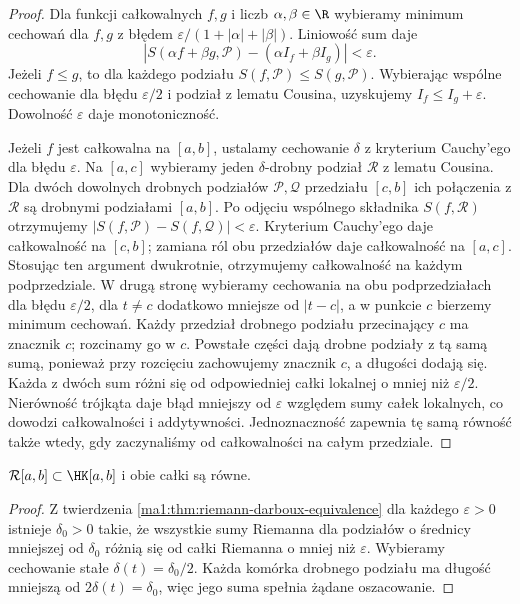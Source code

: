 \begin{proof}
Dla funkcji całkowalnych $f,g$ i liczb $\alpha,\beta\in\R$ wybieramy minimum cechowań dla $f,g$ z błędem $\varepsilon/(1+|\alpha|+|\beta|)$. Liniowość sum daje
\[
 |S(\alpha f+\beta g,\mathcal P)-(\alpha I_f+\beta I_g)|
 <\varepsilon.
\]
Jeżeli $f\le g$, to dla każdego podziału $S(f,\mathcal P)\le S(g,\mathcal P)$. Wybierając wspólne cechowanie dla błędu $\varepsilon/2$ i podział z lematu Cousina, uzyskujemy $I_f\le I_g+\varepsilon$. Dowolność $\varepsilon$ daje monotoniczność.

Jeżeli $f$ jest całkowalna na $[a,b]$, ustalamy cechowanie $\delta$ z kryterium Cauchy'ego dla błędu $\varepsilon$. Na $[a,c]$ wybieramy jeden $\delta$-drobny podział $\mathcal R$ z lematu Cousina. Dla dwóch dowolnych drobnych podziałów $\mathcal P,\mathcal Q$ przedziału $[c,b]$ ich połączenia z $\mathcal R$ są drobnymi podziałami $[a,b]$. Po odjęciu wspólnego składnika $S(f,\mathcal R)$ otrzymujemy $|S(f,\mathcal P)-S(f,\mathcal Q)|<\varepsilon$. Kryterium Cauchy'ego daje całkowalność na $[c,b]$; zamiana ról obu przedziałów daje całkowalność na $[a,c]$. Stosując ten argument dwukrotnie, otrzymujemy całkowalność na każdym podprzedziale. W drugą stronę wybieramy cechowania na obu podprzedziałach dla błędu $\varepsilon/2$, dla $t\ne c$ dodatkowo mniejsze od $|t-c|$, a w punkcie $c$ bierzemy minimum cechowań. Każdy przedział drobnego podziału przecinający $c$ ma znacznik $c$; rozcinamy go w $c$. Powstałe części dają drobne podziały z tą samą sumą, ponieważ przy rozcięciu zachowujemy znacznik $c$, a długości dodają się. Każda z dwóch sum różni się od odpowiedniej całki lokalnej o mniej niż $\varepsilon/2$. Nierówność trójkąta daje błąd mniejszy od $\varepsilon$ względem sumy całek lokalnych, co dowodzi całkowalności i addytywności. Jednoznaczność zapewnia tę samą równość także wtedy, gdy zaczynaliśmy od całkowalności na całym przedziale.
\end{proof}
\begin{stwierdzenie}
$\mathcal R[a,b]\subset\HK[a,b]$ i obie całki są równe.
\end{stwierdzenie}
\begin{proof}
Z twierdzenia \ref{ma1:thm:riemann-darboux-equivalence} dla każdego $\varepsilon>0$ istnieje $\delta_0>0$ takie, że wszystkie sumy Riemanna dla podziałów o średnicy mniejszej od $\delta_0$ różnią się od całki Riemanna o mniej niż $\varepsilon$. Wybieramy cechowanie stałe $\delta(t)=\delta_0/2$. Każda komórka drobnego podziału ma długość mniejszą od $2\delta(t)=\delta_0$, więc jego suma spełnia żądane oszacowanie.
\end{proof}
